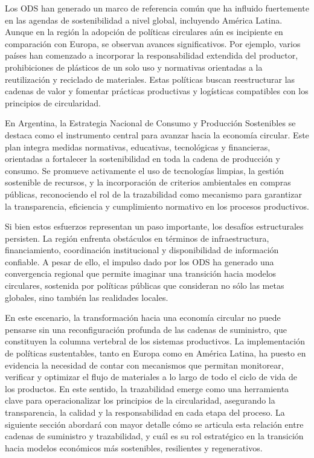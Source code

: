 Los ODS han generado un marco de referencia común que ha influido fuertemente en las agendas de sostenibilidad a nivel global, incluyendo América Latina. Aunque en la región la adopción de políticas circulares aún es incipiente en comparación con Europa, se observan avances significativos. Por ejemplo, varios países han comenzado a incorporar la responsabilidad extendida del productor, prohibiciones de plásticos de un solo uso y normativas orientadas a la reutilización y reciclado de materiales. Estas políticas buscan reestructurar las cadenas de valor y fomentar prácticas productivas y logísticas compatibles con los principios de circularidad.

En Argentina, la Estrategia Nacional de Consumo y Producción Sostenibles se destaca como el instrumento central para avanzar hacia la economía circular. Este plan integra medidas normativas, educativas, tecnológicas y financieras, orientadas a fortalecer la sostenibilidad en toda la cadena de producción y consumo. Se promueve activamente el uso de tecnologías limpias, la gestión sostenible de recursos, y la incorporación de criterios ambientales en compras públicas, reconociendo el rol de la trazabilidad como mecanismo para garantizar la transparencia, eficiencia y cumplimiento normativo en los procesos productivos.

Si bien estos esfuerzos representan un paso importante, los desafíos estructurales persisten. La región enfrenta obstáculos en términos de infraestructura, financiamiento, coordinación institucional y disponibilidad de información confiable. A pesar de ello, el impulso dado por los ODS ha generado una convergencia regional que permite imaginar una transición hacia modelos circulares, sostenida por políticas públicas que consideran no sólo las metas globales, sino también las realidades locales.

En este escenario, la transformación hacia una economía circular no puede pensarse sin una reconfiguración profunda de las cadenas de suministro, que constituyen la columna vertebral de los sistemas productivos. La implementación de políticas sustentables, tanto en Europa como en América Latina, ha puesto en evidencia la necesidad de contar con mecanismos que permitan monitorear, verificar y optimizar el flujo de materiales a lo largo de todo el ciclo de vida de los productos. En este sentido, la trazabilidad emerge como una herramienta clave para operacionalizar los principios de la circularidad, asegurando la transparencia, la calidad y la responsabilidad en cada etapa del proceso. La siguiente sección abordará con mayor detalle cómo se articula esta relación entre cadenas de suministro y trazabilidad, y cuál es su rol estratégico en la transición hacia modelos económicos más sostenibles, resilientes y regenerativos.

